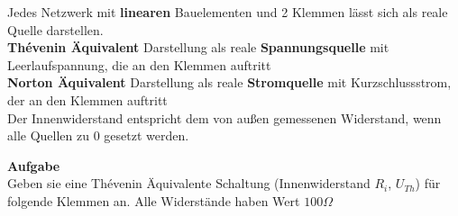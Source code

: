 										\beginip
										Jedes Netzwerk mit \textbf{linearen} Bauelementen und 2 Klemmen lässt sich als reale Quelle darstellen. \\
										\textbf{Thévenin Äquivalent} Darstellung als reale \textbf{Spannungsquelle} mit Leerlaufspannung, die an den Klemmen auftritt \\
										\textbf{Norton Äquivalent} Darstellung als reale \textbf{Stromquelle}  mit Kurzschlussstrom, der an den Klemmen auftritt\\
										Der Innenwiderstand entspricht dem von außen gemessenen Widerstand, wenn alle Quellen zu 0 gesetzt werden.
										\begin{center}
											\fix
										\end{center}
										\iend






										\beginip
										\textbf{Aufgabe}
										\\Geben sie eine Thévenin Äquivalente Schaltung (Innenwiderstand $R_i$, $U_{Th}$) für folgende Klemmen an. Alle Widerstände haben Wert $100\Omega$ \\

